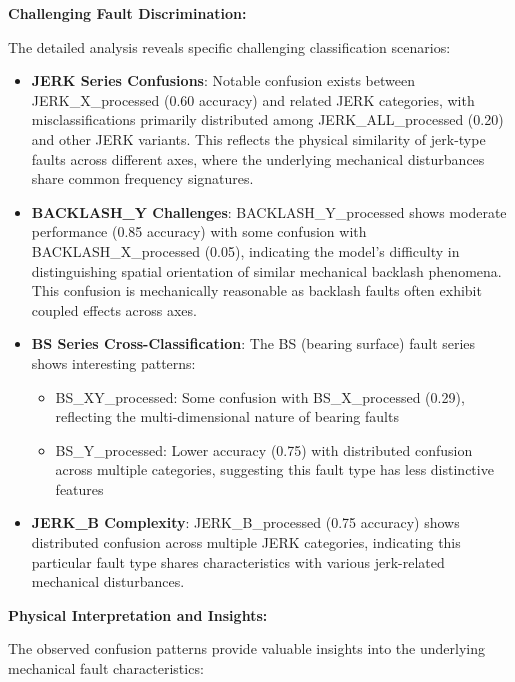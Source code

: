 \textbf{Challenging Fault Discrimination:}

The detailed analysis reveals specific challenging classification scenarios:

\begin{itemize}
    \item \textbf{JERK Series Confusions}: Notable confusion exists between JERK\_X\_processed (0.60 accuracy) and related JERK categories, with misclassifications primarily distributed among JERK\_ALL\_processed (0.20) and other JERK variants. This reflects the physical similarity of jerk-type faults across different axes, where the underlying mechanical disturbances share common frequency signatures.
    
    \item \textbf{BACKLASH\_Y Challenges}: BACKLASH\_Y\_processed shows moderate performance (0.85 accuracy) with some confusion with BACKLASH\_X\_processed (0.05), indicating the model's difficulty in distinguishing spatial orientation of similar mechanical backlash phenomena. This confusion is mechanically reasonable as backlash faults often exhibit coupled effects across axes.
    
    \item \textbf{BS Series Cross-Classification}: The BS (bearing surface) fault series shows interesting patterns:
    \begin{itemize}
        \item BS\_XY\_processed: Some confusion with BS\_X\_processed (0.29), reflecting the multi-dimensional nature of bearing faults
        \item BS\_Y\_processed: Lower accuracy (0.75) with distributed confusion across multiple categories, suggesting this fault type has less distinctive features
    \end{itemize}
    
    \item \textbf{JERK\_B Complexity}: JERK\_B\_processed (0.75 accuracy) shows distributed confusion across multiple JERK categories, indicating this particular fault type shares characteristics with various jerk-related mechanical disturbances.
\end{itemize}

\textbf{Physical Interpretation and Insights:}

The observed confusion patterns provide valuable insights into the underlying mechanical fault characteristics:

